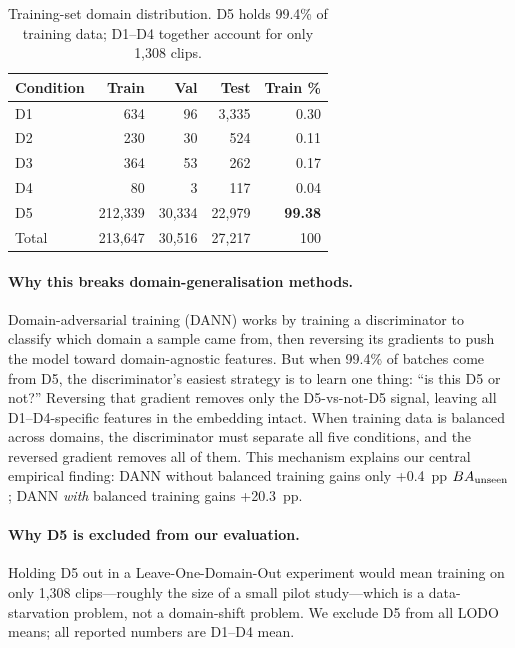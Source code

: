 \begin{table}[t]
  \centering
  \caption{Training-set domain distribution. D5 holds 99.4\% of
           training data; D1--D4 together account for only 1,308 clips.}
  \label{tab:domain_counts}
  \setlength{\tabcolsep}{5pt}
  \begin{tabular}{lrrrr}
    \toprule
    Condition & Train & Val & Test & Train \% \\
    \midrule
    D1 & 634   & 96     & 3{,}335  & 0.30 \\
    D2 & 230   & 30     & 524      & 0.11 \\
    D3 & 364   & 53     & 262      & 0.17 \\
    D4 & 80    & 3      & 117      & 0.04 \\
    D5 & 212{,}339 & 30{,}334 & 22{,}979 & \textbf{99.38} \\
    \midrule
    Total & 213{,}647 & 30{,}516 & 27{,}217 & 100 \\
    \bottomrule
  \end{tabular}
\end{table}

\paragraph{Why this breaks domain-generalisation methods.}
Domain-adversarial training (DANN) works by training a discriminator
to classify which domain a sample came from, then reversing its
gradients to push the model toward domain-agnostic features.
But when 99.4\% of batches come from D5, the discriminator's easiest
strategy is to learn one thing: ``is this D5 or not?''
Reversing that gradient removes only the D5-vs-not-D5 signal, leaving
all D1--D4-specific features in the embedding intact.
When training data is balanced across domains, the discriminator
must separate all five conditions, and the reversed gradient removes
all of them.
This mechanism explains our central empirical finding: DANN without
balanced training gains only +0.4~pp $BA_{\text{unseen}}$; DANN \emph{with}
balanced training gains +20.3~pp.

\paragraph{Why D5 is excluded from our evaluation.}
Holding D5 out in a Leave-One-Domain-Out experiment would mean
training on only 1,308 clips---roughly the size of a small pilot
study---which is a data-starvation problem, not a domain-shift problem.
We exclude D5 from all LODO means; all reported numbers are D1--D4
mean.

